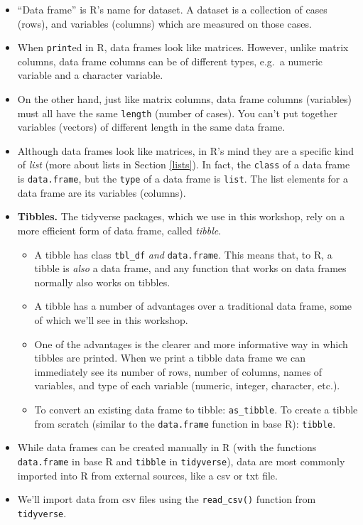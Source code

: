 \documentclass[
]{book}
\providecommand{\tightlist}{%
  \setlength{\itemsep}{0pt}\setlength{\parskip}{0pt}}
\begin{document}
\begin{itemize}
\tightlist
\item
  ``Data frame'' is R's name for dataset. A dataset is a collection of cases (rows), and variables (columns) which are measured on those cases.
\item
  When \texttt{print}ed in R, data frames look like matrices. However, unlike matrix columns, data frame columns can be of different types, e.g.~a numeric variable and a character variable.
\item
  On the other hand, just like matrix columns, data frame columns (variables) must all have the same \texttt{length} (number of cases). You can't put together variables (vectors) of different length in the same data frame.
\item
  Although data frames look like matrices, in R's mind they are a specific kind of \emph{list} (more about lists in Section \ref{lists}). In fact, the \texttt{class} of a data frame is \texttt{data.frame}, but the \texttt{type} of a data frame is \texttt{list}. The list elements for a data frame are its variables (columns).
\item
  \textbf{Tibbles.} The tidyverse packages, which we use in this workshop, rely on a more efficient form of data frame, called \emph{tibble}.

  \begin{itemize}
  \tightlist
  \item
    A tibble has class \texttt{tbl\_df} \emph{and} \texttt{data.frame}. This means that, to R, a tibble is \emph{also} a data frame, and any function that works on data frames normally also works on tibbles.
  \item
    A tibble has a number of advantages over a traditional data frame, some of which we'll see in this workshop.
  \item
    One of the advantages is the clearer and more informative way in which tibbles are printed. When we print a tibble data frame we can immediately see its number of rows, number of columns, names of variables, and type of each variable (numeric, integer, character, etc.).
  \item
    To convert an existing data frame to tibble: \texttt{as\_tibble}. To create a tibble from scratch (similar to the \texttt{data.frame} function in base R): \texttt{tibble}.
  \end{itemize}
\item
  While data frames can be created manually in R (with the functions \texttt{data.frame} in base R and \texttt{tibble} in \texttt{tidyverse}), data are most commonly imported into R from external sources, like a csv or txt file.
\item
  We'll import data from csv files using the \texttt{read\_csv()} function from \texttt{tidyverse}.


\end{itemize}
\end{document}
